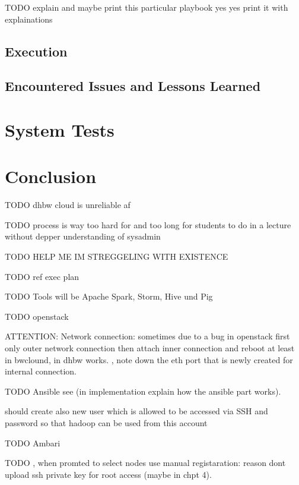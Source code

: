 TODO explain and maybe print this particular playbook yes yes print it with explainations

\subsection{Execution}

\subsection{Encountered Issues and Lessons Learned}

\section{System Tests}

\section{Conclusion}

TODO dhbw cloud is unreliable af

TODO process is way too hard for and too long for students to do in a lecture without depper understanding of sysadmin  



TODO HELP ME IM STREGGELING WITH EXISTENCE



TODO ref exec plan

TODO Tools will be Apache Spark, Storm, Hive und Pig

TODO openstack

    ATTENTION: Network connection: sometimes due to a bug in openstack first only outer network connection then attach inner connection and reboot at least in bwclound, in dhbw works. 
    , note down the eth port that is newly created for internal connection.
    


TODO Ansible
see 
     (in implementation explain how the ansible part works). 
     
     should create also new user which is allowed to be accessed via SSH and  password so that hadoop can be used from this account

TODO Ambari

    TODO ,  when promted to select nodes use manual registaration: reason dont upload ssh private key for root access (maybe in chpt 4).

